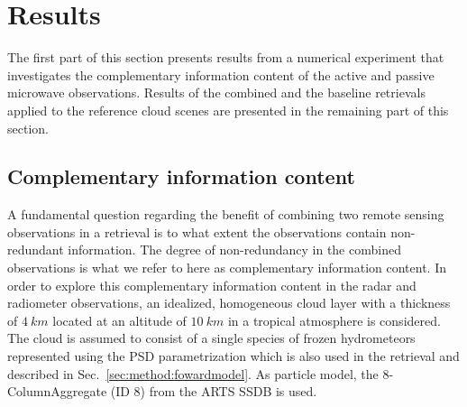 \documentclass[journal abbreviation, manuscript]{copernicus}
\providecommand{\DIFaddend}{} %
\begin{document}
\DIFaddend \section{Results}
\label{sec:results}

The first part of this section presents results from a numerical experiment 
that investigates the complementary information content of the active and passive
microwave observations. Results of the combined  and the baseline retrievals applied
to the reference cloud scenes are presented in the remaining part of this section.

\subsection{Complementary information content}
\label{sec:simple_cloud}

A fundamental question regarding the benefit of combining two remote sensing
observations in a retrieval is to what extent the observations contain
non-redundant information. The degree of non-redundancy in the combined
observations is what we refer to here as complementary information content.
In order to explore this complementary information content in the radar and
radiometer observations, an idealized, homogeneous cloud layer with a thickness
of $4\ \unit{km}$ located at an altitude of $10\ \unit{km}$ in a tropical
atmosphere is considered. The cloud is assumed to consist of a single species of
frozen hydrometeors represented using the PSD parametrization which is also used
in the retrieval and described in Sec.~\ref{sec:method:fowardmodel}. As particle
model, the 8-ColumnAggregate (ID 8) from the ARTS SSDB is used.
\end{document}
